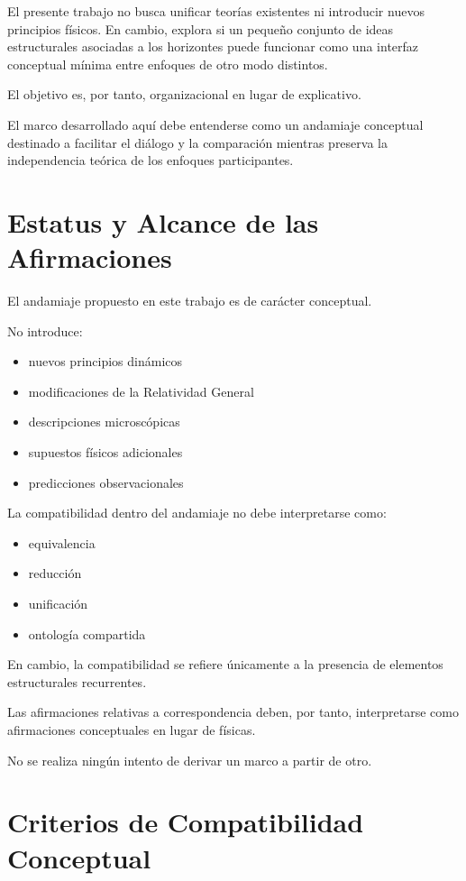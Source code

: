 \documentclass[12pt,a4paper]{article}
\begin{document}
El presente trabajo no busca unificar teorías existentes ni introducir nuevos principios físicos. En cambio, explora si un pequeño conjunto de ideas estructurales asociadas a los horizontes puede funcionar como una interfaz conceptual mínima entre enfoques de otro modo distintos.

El objetivo es, por tanto, organizacional en lugar de explicativo.

El marco desarrollado aquí debe entenderse como un andamiaje conceptual destinado a facilitar el diálogo y la comparación mientras preserva la independencia teórica de los enfoques participantes.

\section{Estatus y Alcance de las Afirmaciones}

El andamiaje propuesto en este trabajo es de carácter conceptual.

No introduce:

\begin{itemize}
  \item nuevos principios dinámicos
  \item modificaciones de la Relatividad General
  \item descripciones microscópicas
  \item supuestos físicos adicionales
  \item predicciones observacionales
\end{itemize}

La compatibilidad dentro del andamiaje no debe interpretarse como:

\begin{itemize}
  \item equivalencia
  \item reducción
  \item unificación
  \item ontología compartida
\end{itemize}

En cambio, la compatibilidad se refiere únicamente a la presencia de elementos estructurales recurrentes.

Las afirmaciones relativas a correspondencia deben, por tanto, interpretarse como afirmaciones conceptuales en lugar de físicas.

No se realiza ningún intento de derivar un marco a partir de otro.

\section{Criterios de Compatibilidad Conceptual}
\end{document}
